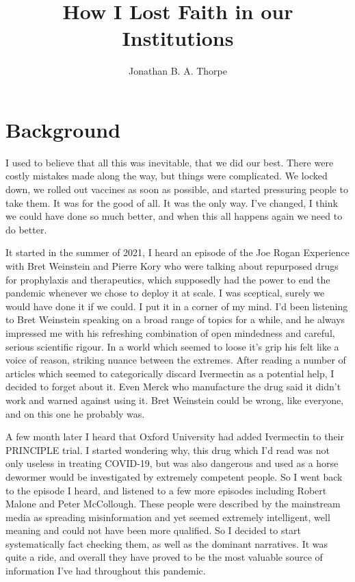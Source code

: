 \documentclass[11pt,a4paper]{article}
\title{How I Lost Faith in our Institutions}
\author{Jonathan B. A. Thorpe}
\begin{document}

\maketitle

\section*{Background}

I used to believe that all this was inevitable, that we did our best. There were costly mistakes made along the way, but things were complicated. We locked down, we rolled out vaccines as soon as possible, and started pressuring people to take them. It was for the good of all. It was the only way. I’ve changed, I think we could have done so much better, and when this all happens again we need to do better. 

It started in the summer of 2021, I heard an episode of the Joe Rogan Experience with Bret Weinstein and Pierre Kory who were talking about repurposed drugs for prophylaxis and therapeutics, which supposedly had the power to end the pandemic whenever we chose to deploy it at scale. I was sceptical, surely we would have done it if we could. I put it in a corner of my mind. I’d been listening to Bret Weinstein speaking on a broad range of topics for a while, and he always impressed me with his refreshing combination of open mindedness and careful, serious scientific rigour. In a world which seemed to loose it’s grip his felt like a voice of reason, striking nuance between the extremes. After reading a number of articles which seemed to categorically discard Ivermectin as a potential help, I decided to forget about it. Even Merck who manufacture the drug said it didn’t work and warned against using it. Bret Weinstein could be wrong, like everyone, and on this one he probably was.

A few month later I heard that Oxford University had added Ivermectin to their PRINCIPLE trial. I started wondering why, this drug which I’d read was not only useless in treating COVID-19, but was also dangerous and used as a horse dewormer would be investigated by extremely competent people. So I went back to the episode I heard, and listened to a few more episodes including Robert Malone and Peter McCollough. These people were described by the mainstream media as spreading misinformation and yet seemed extremely intelligent, well meaning and could not have been more qualified. So I decided to start systematically fact checking them, as well as the dominant narratives. It was quite a ride, and overall they have proved to be the most valuable source of information I’ve had throughout this pandemic.
\end{document}
